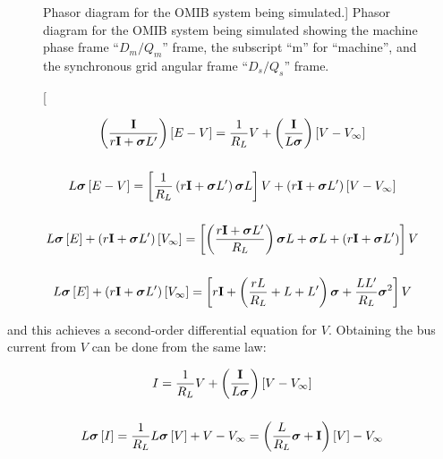 \begin{figure}[htb!]
{
	}
	\caption
[Phasor diagram for the OMIB system being simulated.]
{Phasor diagram for the OMIB system being simulated showing the machine phase frame ``$D_m/Q_m$'' frame, the subscript ``m'' for ``machine'', and the synchronous grid angular frame ``$D_s/Q_s$'' frame.}
	\label{fig:dynamic_phasor_dqaxis_omib}
\end{figure} %

\begin{gather}
	\left(\dfrac{\mathbf{I}}{r\mathbf{I} + \dpo L'}\right)\left[E - V\right] = \dfrac{1}{R_L} V + \left(\dfrac{\mathbf{I}}{L\dpo}\right)\left[V - V_\infty\right] \nonumber\\[5mm]
%
	L\dpo \left[E - V\right] = \left[\dfrac{1}{R_L}\left(r\mathbf{I} + \dpo L'\right)\dpo L\right] V + \left(r\mathbf{I} + \dpo L'\right)\left[V - V_\infty\right] \nonumber\\[5mm]
%           
	L\dpo \left[E\right] + \left(r\mathbf{I} + \dpo L'\right)\left[V_\infty\right] = \left[\left(\dfrac{r\mathbf{I} + \dpo L'}{R_L}\right)\dpo L + \dpo L + \left(r\mathbf{I} + \dpo L'\right)\right] V \nonumber\\[5mm]
%            
	L\dpo \left[E\right] + \left(r\mathbf{I} + \dpo L'\right)\left[V_\infty\right] = \left[r\mathbf{I} + \left(\dfrac{rL}{R_L} + L + L'\right)\dpo + \dfrac{LL'}{R_L}\ndpo{2}\right] V \label{eq:i_omib_diffeq}
\end{gather}

	\noindent and this achieves a second-order differential equation for $V$. Obtaining the bus current from $V$ can be done from the same law:

\begin{gather}
	I = \dfrac{1}{R_L} V + \left(\dfrac{\mathbf{I}}{L\dpo}\right)\left[V - V_\infty\right] \nonumber\\[5mm]
%
	L\dpo\left[I\right] = \dfrac{1}{R_L} L\dpo\left[V\right] + V - V_\infty = \left(\dfrac{L}{R_L}\dpo + \mathbf{I}\right)\left[V\right] - V_\infty \label{eq:v_omib_diffeq}
\end{gather}

